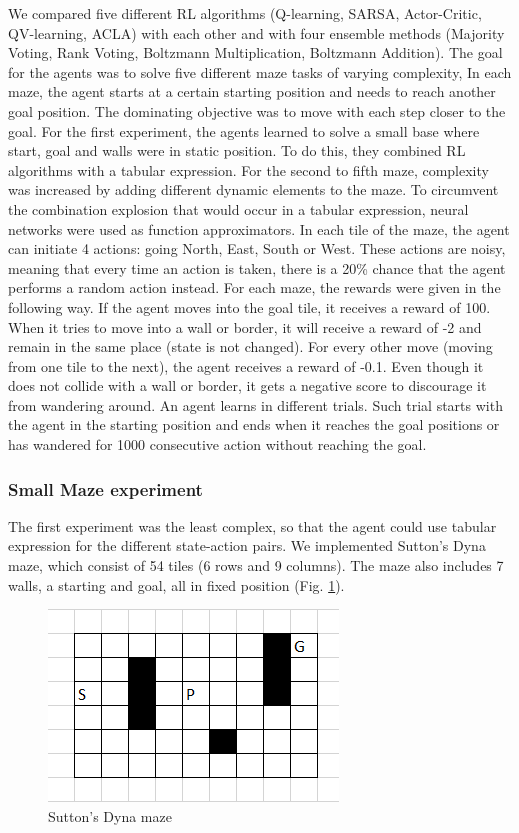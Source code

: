 \documentclass[letterpaper]{article}
\begin{document}
We compared five different RL algorithms (Q-learning, SARSA,
Actor-Critic, QV-learning, ACLA) with each other and with four ensemble
methods (Majority Voting, Rank Voting, Boltzmann Multiplication,
Boltzmann Addition). The goal for the agents was to solve five different
maze tasks of varying complexity, In each maze, the agent starts at a
certain starting position and needs to reach another goal position. The
dominating objective was to move with each step closer to the goal. For
the first experiment, the agents learned to solve a small base where
start, goal and walls were in static position. To do this, they combined
RL algorithms with a tabular expression. For the second to fifth maze,
complexity was increased by adding different dynamic elements to the
maze. To circumvent the combination explosion that would occur in a
tabular expression, neural networks were used as function approximators.
In each tile of the maze, the agent can initiate 4 actions: going North,
East, South or West. These actions are noisy, meaning that every time an
action is taken, there is a 20\% chance that the agent performs a random
action instead. For each maze, the rewards were given in the following
way. If the agent moves into the goal tile, it receives a reward of 100.
When it tries to move into a wall or border, it will receive a reward of
-2 and remain in the same place (state is not changed). For every other
move (moving from one tile to the next), the agent receives a reward of
-0.1. Even though it does not collide with a wall or border, it gets a
negative score to discourage it from wandering around. An agent learns
in different trials. Such trial starts with the agent in the starting
position and ends when it reaches the goal positions or has wandered for
1000 consecutive action without reaching the goal.

\subsubsection{Small Maze experiment}\label{small-maze-experiment}

The first experiment was the least complex, so that the agent could use
tabular expression for the different state-action pairs. We implemented
Sutton's Dyna maze, which consist of 54 tiles (6 rows and 9 columns).
The maze also includes 7 walls, a starting and goal, all in fixed
position (Fig. \ref{simpleMaze}).

\begin{figure}
\centering
\includegraphics[scale=0.5]{img/simpleMaze.png}
\caption{Sutton's Dyna maze \label{simpleMaze}}
\end{figure}
\end{document}
